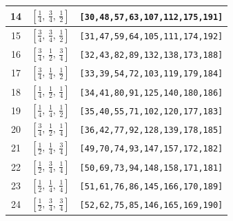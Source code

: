 \documentclass[fleqn,8pt]{jsarticle}
\begin{document}
\begin{longtable}{ccc}
14 & $\left[ \frac{1}{4},\, \frac{3}{4},\, \frac{1}{2} \right]$ & {\tt [30,48,57,63,107,112,175,191]} \\ \hline
15 & $\left[ \frac{3}{4},\, \frac{3}{4},\, \frac{1}{2} \right]$ & {\tt [31,47,59,64,105,111,174,192]} \\ \hline
16 & $\left[ \frac{3}{4},\, \frac{1}{2},\, \frac{3}{4} \right]$ & {\tt [32,43,82,89,132,138,173,188]} \\ \hline
17 & $\left[ \frac{3}{4},\, \frac{1}{4},\, \frac{1}{2} \right]$ & {\tt [33,39,54,72,103,119,179,184]} \\ \hline
18 & $\left[ \frac{1}{4},\, \frac{1}{2},\, \frac{1}{4} \right]$ & {\tt [34,41,80,91,125,140,180,186]} \\ \hline
19 & $\left[ \frac{1}{4},\, \frac{1}{4},\, \frac{1}{2} \right]$ & {\tt [35,40,55,71,102,120,177,183]} \\ \hline
20 & $\left[ \frac{3}{4},\, \frac{1}{2},\, \frac{1}{4} \right]$ & {\tt [36,42,77,92,128,139,178,185]} \\ \hline
21 & $\left[ \frac{1}{2},\, \frac{1}{4},\, \frac{3}{4} \right]$ & {\tt [49,70,74,93,147,157,172,182]} \\ \hline
22 & $\left[ \frac{1}{2},\, \frac{3}{4},\, \frac{1}{4} \right]$ & {\tt [50,69,73,94,148,158,171,181]} \\ \hline
23 & $\left[ \frac{1}{2},\, \frac{1}{4},\, \frac{1}{4} \right]$ & {\tt [51,61,76,86,145,166,170,189]} \\ \hline
24 & $\left[ \frac{1}{2},\, \frac{3}{4},\, \frac{3}{4} \right]$ & {\tt [52,62,75,85,146,165,169,190]} \\
\end{longtable}
\renewcommand{\arraystretch}{1.2}
\end{document}
